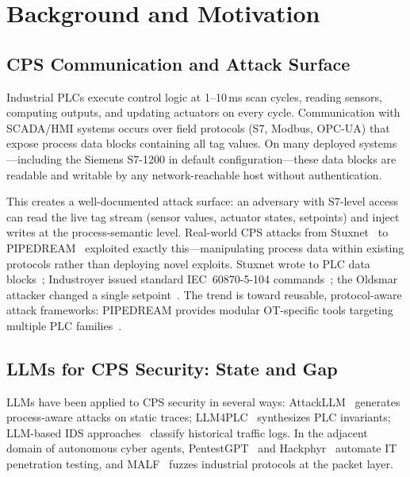 \section{Background and Motivation}
\label{sec:background}

\subsection{CPS Communication and Attack Surface}

Industrial PLCs execute control logic at 1--10\,ms scan cycles, reading sensors, computing outputs, and updating actuators on every cycle. Communication with SCADA/HMI systems occurs over field protocols (S7, Modbus, OPC-UA) that expose process data blocks containing all tag values. On many deployed systems---including the Siemens S7-1200 in default configuration---these data blocks are readable and writable by any network-reachable host without authentication.

This creates a well-documented attack surface: an adversary with S7-level access can read the live tag stream (sensor values, actuator states, setpoints) and inject writes at the process-semantic level. Real-world CPS attacks from Stuxnet~\cite{langner2011stuxnet} to PIPEDREAM~\cite{cisa2022pipedream} exploited exactly this---manipulating process data within existing protocols rather than deploying novel exploits. Stuxnet wrote to PLC data blocks~\cite{falliere2011w32}; Industroyer issued standard IEC~60870-5-104 commands~\cite{cherepanov2017industroyer}; the Oldsmar attacker changed a single setpoint~\cite{cisa2021oldsmar}. The trend is toward reusable, protocol-aware attack frameworks: PIPEDREAM provides modular OT-specific tools targeting multiple PLC families~\cite{greenberg2022pipedream}.

\subsection{LLMs for CPS Security: State and Gap}

LLMs have been applied to CPS security in several ways: AttackLLM~\cite{ahmed2025attackllm} generates process-aware attacks on static traces; LLM4PLC~\cite{fakih2024llm4plc} synthesizes PLC invariants; LLM-based IDS approaches~\cite{ann2024ids_llm,sharshar2025explainable} classify historical traffic logs. In the adjacent domain of autonomous cyber agents, PentestGPT~\cite{deng2024pentestgpt} and Hackphyr~\cite{rigaki2024hackphyr} automate IT penetration testing, and MALF~\cite{ning2025malf} fuzzes industrial protocols at the packet layer.

